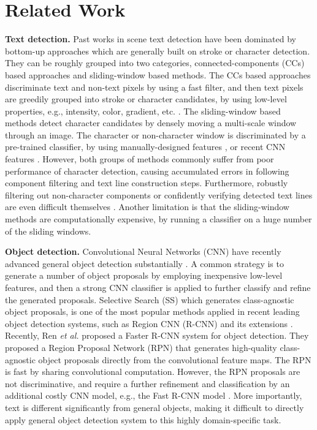 \documentclass[runningheads]{llncs}
\begin{document}
\section{Related Work}
\textbf{Text detection.}  Past works in scene text detection have been dominated by bottom-up approaches which are generally built on stroke or character detection. They can be roughly grouped into two categories, connected-components (CCs) based approaches and sliding-window based methods.  The CCs based approaches discriminate text and non-text pixels by using a fast filter, and then text pixels are greedily grouped into stroke or character candidates, by using  low-level properties, e.g., intensity, color, gradient, etc. \cite{Yin2014,Huang2014,Yin2015,Huang2013,Epshtein2010}.  The sliding-window based methods detect character candidates by densely moving a multi-scale window through an image. The character or non-character window is discriminated by a pre-trained classifier, by using manually-designed features \cite{Tian2015,Wang2011},  or recent CNN features \cite{Jaderberg2014}.  However, both groups of methods commonly suffer from poor performance of character detection, causing accumulated errors in following component filtering and text line construction steps. Furthermore, robustly filtering out non-character components or confidently verifying detected text lines are even difficult themselves \cite{Busta2015,Yin2014,Huang2014}. Another limitation is that the sliding-window methods  are computationally expensive, by running a classifier on a huge number of the sliding windows. 


\textbf{Object detection.}  Convolutional Neural Networks (CNN) have recently advanced general object detection substantially \cite{Ren2015,Girshick2015,Girshick2014}. A common strategy is to generate a number of  object proposals by employing inexpensive  low-level features, and then a strong CNN classifier is applied to further classify and refine the generated proposals. Selective Search (SS) \cite{Everingham2010} which  generates class-agnostic object proposals,  is one of the most popular methods applied in recent leading object detection systems, such as Region CNN (R-CNN) \cite{Girshick2014} and its extensions \cite{Girshick2015}. Recently, Ren \textit{et al.} \cite{Ren2015} proposed a Faster R-CNN system for object detection. They proposed a Region Proposal Network (RPN) that generates  high-quality class-agnostic object proposals  directly from the convolutional feature maps. The RPN is fast by sharing convolutional computation. However, the RPN proposals are not discriminative, and require a further refinement and classification by an additional costly CNN model, e.g., the Fast R-CNN model \cite{Girshick2015}. More importantly,  text is different significantly from general objects, making it difficult to directly apply general object detection system to this highly domain-specific task.
\end{document}
